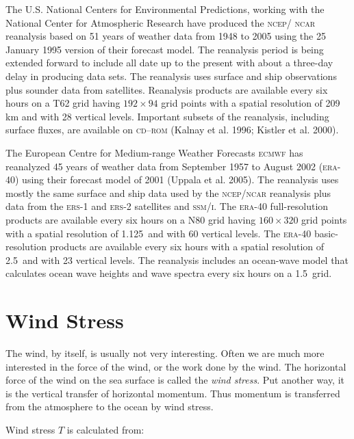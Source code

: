 \begin{enumerate}
\vitem The U.S. National Centers for Environmental Predictions,
working with the National Center for Atmospheric Research have
produced the \textsc{ncep/ ncar} reanalysis based on 51 years of
weather data from 1948 to 2005 using the 25 January 1995 version of
their forecast model. The reanalysis period is being extended forward
to include all date up to the present with about a three-day delay in
producing data sets. The reanalysis uses surface and ship observations
plus sounder data from satellites.  Reanalysis products are available
every six hours on a T62 grid having $192 \times 94$ grid points with
a spatial resolution of 209 km and with 28 vertical levels. Important
subsets of the reanalysis, including surface fluxes, are available on
\textsc{cd--rom} (Kalnay et al. 1996; Kistler et al. 2000).

\vitem The European Centre for Medium-range Weather Forecasts
\textsc{ecmwf} has reanalyzed 45 years of weather data from September
1957 to August 2002 (\textsc{era}-40) using their forecast model of
2001 (Uppala et al. 2005). The reanalysis uses mostly the same surface
and ship data used by the \textsc{ncep/ncar} reanalysis plus data from
the \textsc{ers}-1 and \textsc{ers}-2 satellites
and \textsc{ssm/i}. The \textsc{era}-40 full-resolution products are
available every six hours on a N80 grid having $160 \times 320$ grid
points with a spatial resolution of 1.125\degrees\ and with 60
vertical levels. The \textsc{era}-40 basic-resolution products are
available every six hours with a spatial resolution of
2.5\degrees\ and with 23 vertical levels. The reanalysis includes an
ocean-wave model that calculates ocean wave heights and wave spectra
every six hours on a 1.5\degrees\ grid.
\end{enumerate}

\section{Wind Stress}
The wind, by itself, is usually not very
interesting. Often we are much more interested in the force of the
wind, or the work done by the wind. The horizontal force of the wind
on the sea surface is called the \textit{wind stress}. Put another
way, it is the vertical transfer of horizontal momentum. Thus momentum
is transferred from the atmosphere to the ocean by wind stress.

Wind stress $T$ is calculated from:

